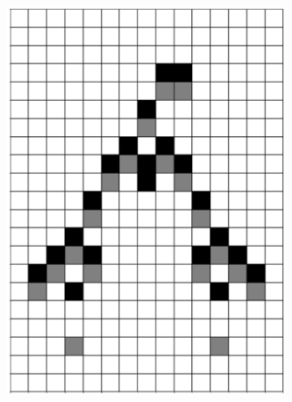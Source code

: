 \documentclass[12pt]{article}
\numberwithin{figure}{section} %
\begin{document}
\begin{figure}[H]
\begin{subfigure}{0.19\textwidth}
     \includegraphics[width=\linewidth]{Section4/26.2}
     \subcaption{}
   \end{subfigure}
           \begin{subfigure}{0.19\textwidth}
     \centering

\end{subfigure}
\end{figure}
\end{document}
